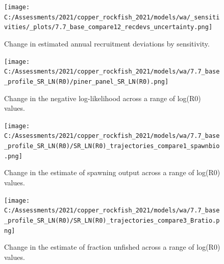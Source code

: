 \documentclass[11pt,
  english,
  a4paper,
]{article}
\begin{document}
\tagmcend\tagstructend


\begin{figure}
\centering
\texttt{[image: C:/Assessments/2021/copper\_rockfish\_2021/models/wa/\_sensitivities/\_plots/7.7\_base\_compare12\_recdevs\_uncertainty.png]}
\caption{Change in estimated annual recruitment deviations by sensitivity.\label{fig:sens-recr}}
\end{figure}

\tagmcend\tagstructend


\begin{figure}
\centering
\texttt{[image: C:/Assessments/2021/copper\_rockfish\_2021/models/wa/7.7\_base\_profile\_SR\_LN(R0)/piner\_panel\_SR\_LN(R0).png]}
\caption{Change in the negative log-likelihood across a range of log(R0) values.\label{fig:r0-profile}}
\end{figure}

\tagmcend\tagstructend


\begin{figure}
\centering
\texttt{[image: C:/Assessments/2021/copper\_rockfish\_2021/models/wa/7.7\_base\_profile\_SR\_LN(R0)/SR\_LN(R0)\_trajectories\_compare1\_spawnbio.png]}
\caption{Change in the estimate of spawning output across a range of log(R0) values.\label{fig:r0-ssb}}
\end{figure}

\tagmcend\tagstructend


\begin{figure}
\centering
\texttt{[image: C:/Assessments/2021/copper\_rockfish\_2021/models/wa/7.7\_base\_profile\_SR\_LN(R0)/SR\_LN(R0)\_trajectories\_compare3\_Bratio.png]}
\caption{Change in the estimate of fraction unfished across a range of log(R0) values.\label{fig:r0-depl}}
\end{figure}

\tagmcend\tagstructend
\end{document}
